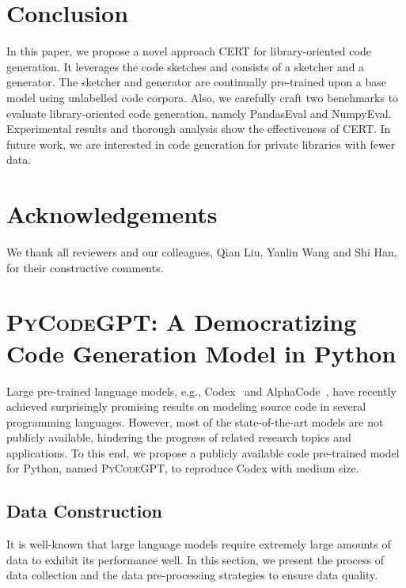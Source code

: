 \documentclass{article}
\newcommand{\cert}{\textsc{CERT}\xspace}
\newcommand{\peval}{PandasEval\xspace}
\newcommand{\neval}{NumpyEval\xspace}
\newcommand{\codepy}{\textsc{PyCodeGPT}\xspace}
\begin{document}
\section{Conclusion}
In this paper, we propose a novel approach \cert for library-oriented code generation. It leverages the code sketches and consists of a sketcher and a generator. The sketcher and generator are continually pre-trained upon a base model using unlabelled code corpora. Also, we carefully craft two benchmarks to evaluate library-oriented code generation, namely \peval and \neval. Experimental results and thorough analysis show the effectiveness of \cert. In future work, we are interested in code generation for private libraries with fewer data.

\section*{Acknowledgements}
We thank all reviewers and our colleagues, Qian Liu, Yanlin Wang and Shi Han, for their constructive comments.




\appendix

\section{\codepy: A Democratizing Code Generation Model in Python}
Large pre-trained language models, e.g., Codex~\cite{chen2021evaluating} and AlphaCode~\cite{li2022competition}, have recently achieved surprisingly promising results on modeling source code in several programming languages. 
However, most of the state-of-the-art models are not publicly available, hindering the progress of related research topics and applications. 
To this end, we propose a publicly available code pre-trained model for Python, named \codepy, to reproduce Codex with medium size. 

\subsection{Data Construction}
It is well-known that large language models require extremely large amounts of data to exhibit its performance well.
In this section, we present the process of data collection and the data pre-processing strategies to ensure data quality.
\end{document}
